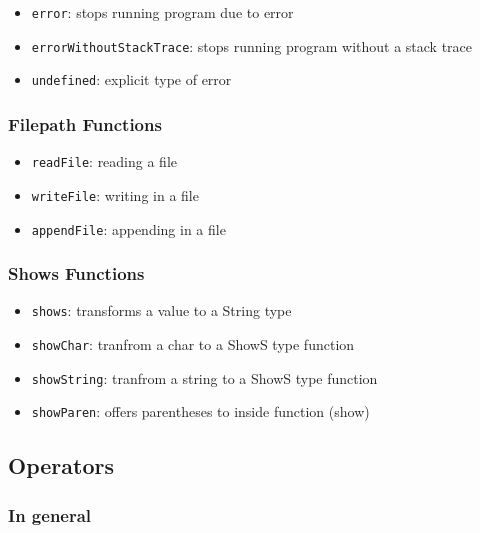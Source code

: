 \documentclass[a4paper, titlepage, twoside]{article}
\begin{document}
\begin{itemize}
\item \texttt{error}: stops running program due to error

\item \texttt{errorWithoutStackTrace}: stops running program without a stack trace

\item \texttt{undefined}: explicit type of error
\end{itemize}

\subsubsection{Filepath Functions}
\label{sec:orgc7f9613}

\begin{itemize}
\item \texttt{readFile}: reading a file

\item \texttt{writeFile}: writing in a file

\item \texttt{appendFile}: appending in a file
\end{itemize}

\subsubsection{Shows Functions}
\label{sec:org91e572d}

\begin{itemize}
\item \texttt{shows}: transforms a value to a String type

\item \texttt{showChar}: tranfrom a char to a ShowS type function

\item \texttt{showString}: tranfrom a string to a ShowS type function

\item \texttt{showParen}: offers parentheses to inside function (show)
\end{itemize}

\subsection{Operators}
\label{sec:orgce5ceb5}

\subsubsection{In general}
\label{sec:orgf7925fd}
\end{document}
